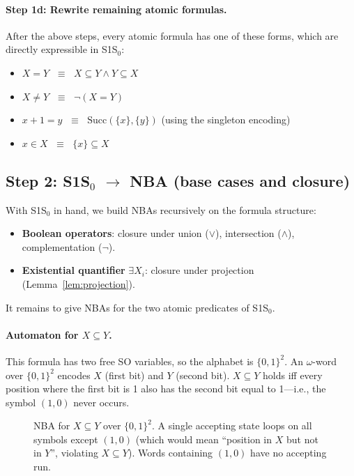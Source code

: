 \paragraph{Step 1d: Rewrite remaining atomic formulas.}
After the above steps, every atomic formula has one of these forms,
which are directly expressible in S1S$_0$:
\begin{itemize}
  \item $X = Y$ $\;\equiv\;$ $X \subseteq Y \land Y \subseteq X$
  \item $X \neq Y$ $\;\equiv\;$ $\neg(X = Y)$
  \item $x+1 = y$ $\;\equiv\;$ $\mathrm{Succ}(\{x\}, \{y\})$
        (using the singleton encoding)
  \item $x \in X$ $\;\equiv\;$ $\{x\} \subseteq X$
\end{itemize}

\subsection{Step 2: S1S$_0$ $\to$ NBA (base cases and closure)}

With S1S$_0$ in hand, we build NBAs recursively on the formula structure:
\begin{itemize}
  \item \textbf{Boolean operators}: closure under union ($\lor$),
        intersection ($\land$), complementation ($\neg$).
  \item \textbf{Existential quantifier} $\exists X_i$: closure under
        projection (Lemma~\ref{lem:projection}).
\end{itemize}
It remains to give NBAs for the two atomic predicates of S1S$_0$.

\paragraph{Automaton for $X \subseteq Y$.}
This formula has two free SO variables, so the alphabet is $\{0,1\}^2$.
An $\omega$-word over $\{0,1\}^2$ encodes $X$ (first bit) and $Y$ (second
bit).  $X \subseteq Y$ holds iff every position where the first bit is 1
also has the second bit equal to 1---i.e., the symbol $(1,0)$ never occurs.

\begin{figure}[ht]
  \centering
  \caption{NBA for $X \subseteq Y$ over $\{0,1\}^2$.  A single accepting
           state loops on all symbols except $(1,0)$ (which would mean
           ``position in $X$ but not in $Y$'', violating $X \subseteq Y$).
           Words containing $(1,0)$ have no accepting run.}
  \label{fig:nba-subset}
\end{figure}

